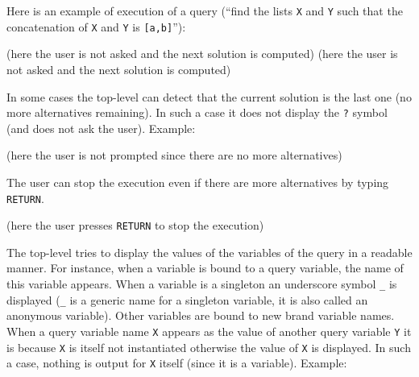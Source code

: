 Here is an example of execution of a query (``find the lists \texttt{X} and
\texttt{Y} such that the concatenation of \texttt{X} and \texttt{Y} is
\texttt{[a,b]}''):

\begin{CodeTwoCols}
\SkipLine
{}
\SkipLine
{}
\SkipLine
{}
    {(here the user is not asked and the next solution is
computed)}
\SkipLine
{}
     {(here the user is not asked and the next solution is
computed)}
\SkipLine
{}
\end{CodeTwoCols}

In some cases the top-level can detect that the current solution is the last
one (no more alternatives remaining). In such a case it does not display the
\texttt{?} symbol (and does not ask the user). Example:

\begin{CodeTwoCols}
\SkipLine
{}
\SkipLine
{}  {(here the user is not prompted since there are no more
alternatives)}
\SkipLine
{}
\end{CodeTwoCols}

The user can stop the execution even if there are more alternatives by
typing \texttt{RETURN}.

\begin{CodeTwoCols}
\SkipLine
{} {(here the user presses \texttt{RETURN} to stop the execution)}
\SkipLine
{}
\end{CodeTwoCols}

The top-level tries to display the values of the variables of the query in a
readable manner. For instance, when a variable is bound to a query variable,
the name of this variable appears. When a variable is a singleton an
underscore symbol \texttt{\_} is displayed (\texttt{\_} is a generic name
for a singleton variable, it is also called an anonymous variable). Other
variables are bound to new brand variable names. When a query variable name
\texttt{X} appears as the value of another query variable \texttt{Y} it is
because \texttt{X} is itself not instantiated otherwise the value of
\texttt{X} is displayed. In such a case, nothing is output for \texttt{X}
itself (since it is a variable). Example:

